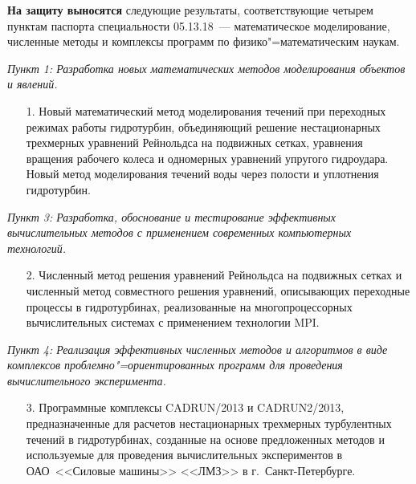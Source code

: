 \textbf{На защиту выносятся} следующие результаты, соответствующие четырем пунктам паспорта 
специальности 05.13.18~--- математическое моделирование, численные методы и комплексы программ 
по физико"=математическим наукам.

\noindent
\textit{Пункт 1: Разработка новых математических методов моделирования объектов и явлений.}
\vspace{-2mm}
\begin{enumerate}
  \setlength{\itemsep}{1pt} \setlength{\parskip}{0pt} \setlength{\parsep}{0pt}
  \item[1.] Новый математический метод моделирования течений при переходных режимах работы 
            гидротурбин, объединяющий решение нестационарных трехмерных уравнений Рейнольдса на подвижных 
            сетках, уравнения вращения рабочего колеса и одномерных уравнений упругого гидроудара. 
            Новый метод моделирования течений воды через полости и уплотнения гидротурбин. 
\end{enumerate}

\noindent
\textit{Пункт 3: Разработка, обоснование и тестирование эффективных вычислительных методов с 
применением современных компьютерных технологий.}
\vspace{-2mm}
\begin{enumerate}
  \setlength{\itemsep}{1pt} \setlength{\parskip}{0pt} \setlength{\parsep}{0pt}
  \item[2.] Численный метод решения уравнений Рейнольдса на подвижных сетках и численный метод совместного 
            решения уравнений, описывающих переходные процессы в гидротурбинах, реализованные на 
            многопроцессорных вычислительных системах с применением технологии MPI.
\end{enumerate}

\noindent
\textit{Пункт 4: Реализация эффективных численных методов и алгоритмов в виде комплексов 
проблемно"=ориентированных программ для проведения вычислительного эксперимента.}
\vspace{-2mm}
\begin{enumerate}
  \setlength{\itemsep}{1pt} \setlength{\parskip}{0pt} \setlength{\parsep}{0pt}
  \item[3.] Программные комплексы CADRUN/2013 и CADRUN2/2013, 
            предназначенные для расчетов нестационарных трехмерных 
            турбулентных течений в гидротурбинах, созданные на основе предложенных методов и используемые для 
            проведения вычислительных экспериментов в ОАО~<<Силовые машины>> <<ЛМЗ>> в г.~Санкт-Петербурге.
\end{enumerate}

